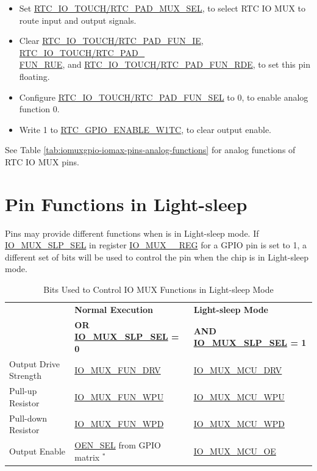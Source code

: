 \documentclass[main\_\_EN.tex]{subfiles}
\begin{document}
\begin{itemize}
    \item Set \hyperref[fielddesc:RTCIOTOUCHPADNMUXSEL]{RTC\_IO\_TOUCH/RTC\_PAD\_MUX\_SEL}, to select RTC IO MUX to route input and output signals.
    \item Clear \hyperref[regdesc:RTCIOTOUCHPADNREG]{RTC\_IO\_TOUCH/RTC\_PAD\_FUN\_IE}, \hyperref[regdesc:RTCIOTOUCHPADNREG]{RTC\_IO\_TOUCH/RTC\_PAD\_\\FUN\_RUE}, and \hyperref[regdesc:RTCIOTOUCHPADNREG]{RTC\_IO\_TOUCH/RTC\_PAD\_FUN\_RDE}, to set this pin floating.
    \item Configure \hyperref[regdesc:RTCIOTOUCHPADNREG]{RTC\_IO\_TOUCH/RTC\_PAD\_FUN\_SEL} to 0, to enable analog function 0.
    \item Write 1 to \hyperref[regdesc:RTCIOTOUCHPADNREG]{RTC\_GPIO\_ENABLE\_W1TC}, to clear output enable.
\end{itemize}
See Table \ref{tab:iomuxgpio-iomax-pins-analog-functions} for analog functions of RTC IO MUX pins.

\section{Pin Functions in Light-sleep}

Pins may provide different functions when \chipname{} is in Light-sleep mode. If \hyperref[fielddesc:IOMUXSLPSEL]{IO\_MUX\_SLP\_SEL} in register \hyperref[regdesc:IOMUXnREG]{IO\_MUX\_\_REG} for a GPIO pin is set to 1, a different set of bits will be used to control the pin when the chip is in Light-sleep mode.

\begin{longtable}[c]{|p{3.5cm}|p{4.5cm}|p{4.5cm}|}
\caption{Bits Used to Control IO MUX Functions in Light-sleep Mode}
\label{tab:iomuxgpio-pin-function-register-light-sleep-mode} \\
    \hline
    \rowcolor{lightgray}
   & \textbf{Normal Execution} & \textbf{Light-sleep Mode} \\
    \rowcolor{lightgray}
   \multirow{-2}{*}{\textbf{IO MUX Functions}}  & \textbf{OR \hyperref[fielddesc:IOMUXSLPSEL]{IO\_MUX\_SLP\_SEL} = 0} & \textbf{AND \hyperref[fielddesc:IOMUXSLPSEL]{IO\_MUX\_SLP\_SEL} = 1} \\
    \hline
Output Drive Strength & \hyperref[fielddesc:IOMUXFUNDRV]{IO\_MUX\_FUN\_DRV} & \hyperref[fielddesc:IOMUXMCUDRV]{IO\_MUX\_MCU\_DRV} \\
\hline
Pull-up Resistor & \hyperref[fielddesc:IOMUXFUNWPU]{IO\_MUX\_FUN\_WPU} & \hyperref[fielddesc:IOMUXMCUWPU]{IO\_MUX\_MCU\_WPU} \\
\hline
Pull-down Resistor & \hyperref[fielddesc:IOMUXFUNWPD]{IO\_MUX\_FUN\_WPD} & \hyperref[fielddesc:IOMUXMCUWPD]{IO\_MUX\_MCU\_WPD} \\
\hline
Output Enable & \hyperref[fielddesc:GPIOFUNCNOENSEL]{OEN\_SEL} from GPIO matrix $^{*}$  & \hyperref[fielddesc:IOMUXMCUOE]{IO\_MUX\_MCU\_OE} \\
\hline
\end{longtable}
\end{document}

